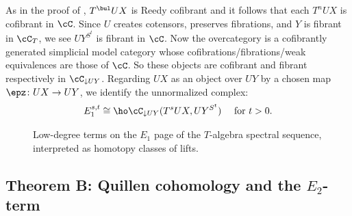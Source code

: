 \documentclass[leqno,oneside,english]{elsarticle}
\begin{document}
As in the proof of , $T^{\bul} UX$ is Reedy cofibrant
and it follows that each $T^n UX$ is cofibrant in $\cC$.
Since $U$ creates cotensors, preserves fibrations,
and $Y$ is fibrant in $\cC_{T}$, we see $UY^{S^t}$ is fibrant in $\cC$.
Now the overcategory is a cofibrantly generated simplicial model category whose 
cofibrations/fibrations/weak equivalences are those of $\cC$. So these 
objects are cofibrant and fibrant respectively in $\cC_{\downarrow UY}$.
Regarding $UX$ as an object over $UY$ by a chosen map $\epz \colon UX \to
UY$, we identify the unnormalized complex:
\begin{align*}\label{eq:E1st-maps-terms}
  E_1^{s,t}\cong \ho\cC_{\downarrow UY}(T^s UX, UY^{S^{t}})\quad \text{ for } t>0.
\end{align*}

\begin{figure}
\caption{Low-degree terms on the $E_1$ page of the $T$-algebra spectral sequence, interpreted as homotopy classes of lifts.}
\end{figure}
\subsection{Theorem B: Quillen cohomology and the
  \texorpdfstring{$E_2$}{E\_2}-term}
\label{sec:methodology}
\end{document}
